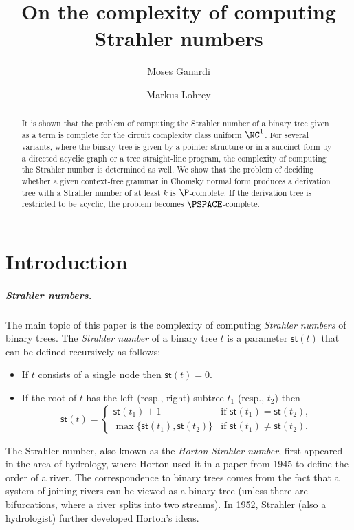 \documentclass[a4paper,UKenglish,cleveref, autoref, thm-restate, numberwithinsect]{lipics-v2021}
\title{On the complexity of computing Strahler numbers}
\author{Moses Ganardi}{University of Kaiserslautern-Landau (RPTU), Germany}{moses.ganardi@cs.rptu.de}{https://orcid.org/0000-0002-0775-7781}{}
\author{Markus Lohrey}{Universit\"at Siegen, Germany}{lohrey@eti.uni-siegen.de}{https://orcid.org/0000-0002-4680-7198}{}
\newcommand{\hs}{\mathsf{st}}
\begin{document}
\maketitle
\begin{abstract}
It is shown that the problem of computing the Strahler number of a binary tree given as a term
 is complete for the circuit complexity
class uniform $\NC^1$. For several variants, where the binary tree is given by a pointer structure or in a succinct form by
a directed acyclic graph or a tree straight-line program, the complexity of computing the Strahler number is determined as well.
We show that the problem of deciding whether a given context-free grammar in Chomsky normal form produces a derivation tree with a Strahler number of at least $k$ is $\P$-complete. If the derivation tree is restricted to be acyclic, the problem becomes $\PSPACE$-complete.

\end{abstract}

\section{Introduction}

\subparagraph{Strahler numbers.}
The main topic of this paper is the complexity of computing \emph{Strahler numbers} of binary trees.
The \emph{Strahler number} of a binary tree $t$ is a parameter $\hs(t)$ that can be defined recursively as follows:
\begin{itemize}
\item If $t$ consists of a single node then $\hs(t) = 0$.
\item If the root of $t$ has the left (resp., right) subtree $t_1$ (resp., $t_2$) then
\begin{equation} \label{eq-strahler-operation}
	\hs(t) = \begin{cases} \hs(t_1)+1 & \text{if } \hs(t_1) = \hs(t_2), \\ \max\{\hs(t_1), \hs(t_2)\} & \text{if } \hs(t_1) \neq \hs(t_2). \end{cases}
\end{equation}
\end{itemize}
The Strahler number, also known as the \emph{Horton-Strahler number}, first appeared in the area of hydrology, where Horton used it in a paper from 1945 \cite{Ho45}
to define the order of a river. The correspondence to binary trees comes from the fact that a system of joining rivers
can be viewed as a binary tree (unless there are bifurcations, where a river splits into two streams).
In 1952, Strahler \cite{Stra52} (also a hydrologist) further developed Horton's ideas. 
\end{document}

